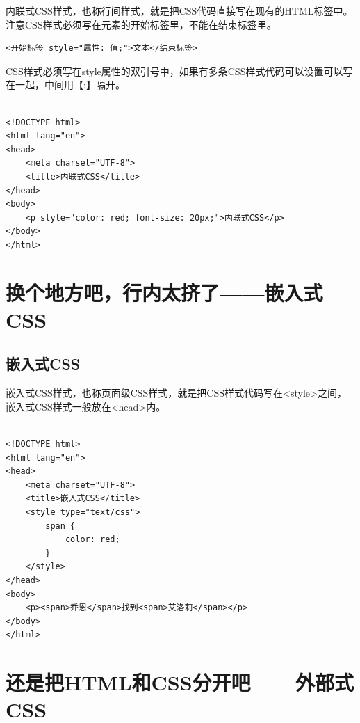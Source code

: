 内联式CSS样式，也称行间样式，就是把CSS代码直接写在现有的HTML标签中。注意CSS样式必须写在元素的开始标签里，不能在结束标签里。 \\

\begin{lstlisting}[style=htmlcssjs]
<开始标签 style="属性: 值;">文本</结束标签>
\end{lstlisting}

CSS样式必须写在style属性的双引号中，如果有多条CSS样式代码可以设置可以写在一起，中间用【;】隔开。 \\

 \\

\begin{lstlisting}[style=htmlcssjs]
<!DOCTYPE html>
<html lang="en">
<head>
    <meta charset="UTF-8">
    <title>内联式CSS</title>
</head>
<body>
    <p style="color: red; font-size: 20px;">内联式CSS</p>
</body>
</html>
\end{lstlisting}

\newpage

\section{换个地方吧，行内太挤了——嵌入式CSS}

\subsection{嵌入式CSS}

嵌入式CSS样式，也称页面级CSS样式，就是把CSS样式代码写在<style>之间，嵌入式CSS样式一般放在<head>内。 \\

 \\

\begin{lstlisting}[style=htmlcssjs]
<!DOCTYPE html>
<html lang="en">
<head>
    <meta charset="UTF-8">
    <title>嵌入式CSS</title>
    <style type="text/css">
        span {
            color: red;
        }
    </style>
</head>
<body>
    <p><span>乔恩</span>找到<span>艾洛莉</span></p>
</body>
</html>
\end{lstlisting}

\newpage

\section{还是把HTML和CSS分开吧——外部式CSS}

